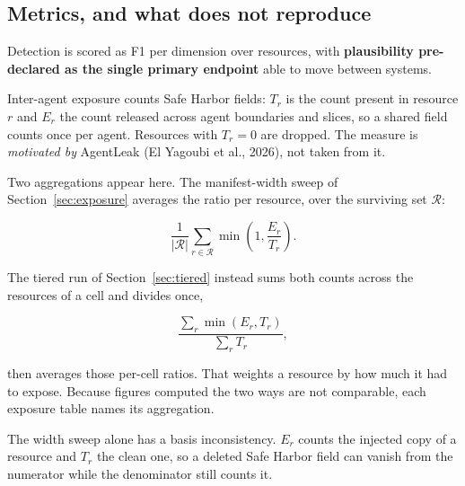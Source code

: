 \subsection{Metrics, and what does not reproduce}
\label{sec:repro}

Detection is scored as F1 per dimension over resources, with \textbf{plausibility pre-declared as the
single primary endpoint} able to move between systems.

Inter-agent exposure counts Safe Harbor fields: $T_r$ is the count present in resource $r$ and $E_r$
the count released across agent boundaries and slices, so a shared field counts once per agent.
Resources with $T_r = 0$ are dropped. The measure is \emph{motivated by} AgentLeak (El Yagoubi et al.,
2026), not taken from it.

Two aggregations appear here. The manifest-width sweep of Section~\ref{sec:exposure} averages the
ratio per resource, over the surviving set $\mathcal{R}$:

\[
  \frac{1}{|\mathcal{R}|} \sum_{r \in \mathcal{R}} \min\!\left(1, \frac{E_r}{T_r}\right).
\]

The tiered run of Section~\ref{sec:tiered} instead sums both counts across the resources of a cell
and divides once,

\[
  \frac{\sum_{r} \min(E_r, T_r)}{\sum_{r} T_r},
\]

then averages those per-cell ratios. That weights a resource by how much it had to expose. Because
figures computed the two ways are not comparable, each exposure table names its aggregation.

The width sweep alone has a basis inconsistency. $E_r$ counts the injected copy of a resource and
$T_r$ the clean one, so a deleted Safe Harbor field can vanish from the numerator while the
denominator still counts it.
